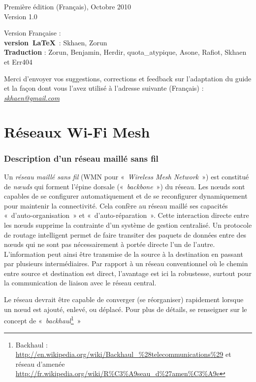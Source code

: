 \documentclass[a4paper,french,11pt,twoside]{article}
\begin{document}
\bigskip
\medskip
\noindent Première édition (Français), Octobre 2010\\
\noindent Version 1.0

\bigskip
\noindent Version Française : \\
\noindent \textbf{version~\LaTeX}~: Skhaen, Zorun \\
\noindent \textbf{Traduction} : Zorun, Benjamin, Herdir, quota\_atypique, Asone, Rafiot, Skhaen et Err404

\bigskip
Merci d'envoyer vos suggestions, corrections et feedback sur l'adaptation du guide et la façon dont vous l'avez utilisé à l'adresse suivante (Français) : \href{mailto:skhaen@gmail.com}{\textit{skhaen@gmail.com}}

\newpage
\thispagestyle{empty}
\tableofcontents
\thispagestyle{empty}
\newpage

\setcounter{page}{3}
\part{Réseaux Wi-Fi Mesh}
\section{Description d'un réseau maillé sans fil}

Un \emph{réseau maillé sans fil} (WMN pour «~\textit{Wireless Mesh Network}~») est constitué de \emph{nœuds} qui forment l'épine dorsale («~\textit{backbone}~») du réseau. Les nœuds sont capables de se configurer automatiquement et de se reconfigurer dynamiquement pour maintenir la connectivité. Cela confère au réseau maillé ses capacités «~d'auto-organisation~» et «~d'auto-réparation~». Cette interaction directe entre les nœuds supprime la contrainte d'un système de gestion centralisé. Un protocole de routage intelligent permet de faire transiter des paquets de données entre des nœuds qui ne sont pas nécessairement à portée directe l'un de l'autre. L'information peut ainsi être transmise de la source à la destination en passant par plusieurs intermédiaires. Par rapport à un réseau conventionnel où le chemin entre source et destination est direct, l'avantage est ici la robustesse, surtout pour la communication de liaison avec le réseau central.

Le réseau devrait être capable de converger (se réorganiser) rapidement lorsque un nœud est ajouté, enlevé, ou déplacé. Pour plus de détails, se renseigner sur le concept de «~\textit{backhaul}\footnote{Backhaul : \url{http://en.wikipedia.org/wiki/Backhaul\_\%28telecommunications\%29} et réseau d'amenée \url{http://fr.wikipedia.org/wiki/R\%C3\%A9seau_d\%27amen\%C3\%A9e}}~»
\end{document}

